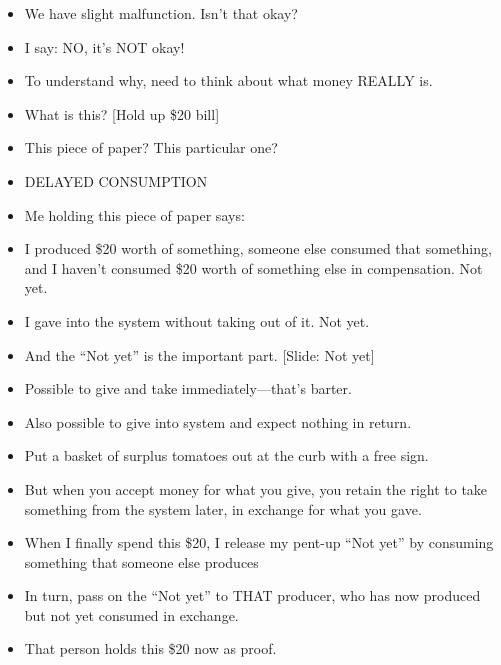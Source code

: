 \documentclass[12pt]{article}
\begin{document}
{\begin{itemize}
\item We have slight malfunction.  Isn't that okay?

\item I say:  NO, it's NOT okay!

\item To understand why, need to think about what money REALLY is.



\item What is this?  [Hold up \$20 bill]

\item This piece of paper?  This particular one?

\item DELAYED CONSUMPTION

\item Me holding this piece of paper says:

\item I produced \$20 worth of something, someone else consumed that something, and I haven't consumed \$20 worth of something else in compensation.  Not yet.

\item I gave into the system without taking out of it.  Not yet.

\item And the ``Not yet'' is the important part. [Slide:  Not yet]

\item Possible to give and take immediately---that's barter.

\item Also possible to give into system and expect nothing in return.

\item Put a basket of surplus tomatoes out at the curb with a free sign.

\item But when you accept money for what you give, you retain the right to take something from the system later, in exchange for what you gave.


\item When I finally spend this \$20, I release my pent-up ``Not yet'' by consuming something that someone else produces

\item In turn, pass on the ``Not yet'' to THAT producer, who has now produced but not yet consumed in exchange.

\item That person holds this \$20 now as proof.


\end{itemize}}
\end{document}
